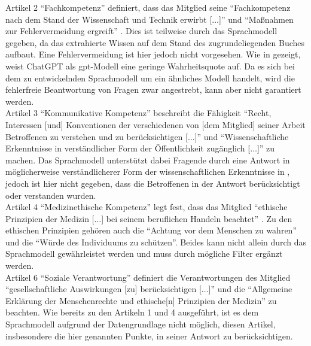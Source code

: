 Artikel 2 \enquote{Fachkompetenz} definiert, dass das Mitglied seine \enquote{Fachkompetenz nach dem Stand der Wissenschaft und Technik erwirbt [$\dots$]} und \enquote{Maßnahmen zur Fehlervermeidung ergreift} \citep{gmds_eth}.
Dies ist teilweise durch das Sprachmodell gegeben, da das extrahierte Wissen auf dem Stand des zugrundeliegenden Buches \citet{bb} aufbaut.
Eine Fehlervermeidung ist hier jedoch nicht vorgesehen.
Wie in \citet{chatgpt_qas} gezeigt, weist ChatGPT als \ac{gpt}-Modell eine geringe Wahrheitsquote auf.
Da es sich bei dem zu entwickelnden Sprachmodell um ein ähnliches Modell handelt, wird die fehlerfreie Beantwortung von Fragen zwar angestrebt, kann aber nicht garantiert werden.\\

Artikel 3 \enquote{Kommunikative Kompetenz} beschreibt die Fähigkeit
\enquote{Recht, Interessen [und] Konventionen der verschiedenen von [dem Mitglied] seiner Arbeit Betroffenen zu verstehen und zu berücksichtigen [$\dots$]} und
\enquote{Wissenschaftliche Erkenntnisse in verständlicher Form der Öffentlichkeit zugänglich [$\dots$]} \citep{gmds_eth} zu machen.
Das Sprachmodell unterstützt dabei Fragende durch eine Antwort in möglicherweise verständlicherer Form der wissenschaftlichen Erkenntnisse in \citet{bb},
jedoch ist hier nicht gegeben, dass die Betroffenen in der Antwort berücksichtigt oder verstanden wurden.\\

Artikel 4 \enquote{Medizinethische Kompetenz} legt fest, dass das Mitglied
\enquote{ethische Prinzipien der Medizin [$\dots$] bei seinem beruflichen Handeln beachtet} \citep{gmds_eth}.
Zu den ethischen Prinzipien \citep{gmds_eth} gehören auch die \enquote{Achtung vor dem Menschen zu wahren} und die \enquote{Würde des Individuums zu schützen}.
Beides kann nicht allein durch das Sprachmodell gewährleistet werden und muss durch mögliche Filter ergänzt werden.\\

Artikel 6 \enquote{Soziale Verantwortung} definiert die Verantwortungen des Mitglied
\enquote{gesellschaftliche Auswirkungen [zu] berücksichtigen [$\dots$]} und die
\enquote{Allgemeine Erklärung der Menschenrechte und ethische[n] Prinzipien der Medizin} \citep{gmds_eth} zu beachten.
Wie bereits zu den Artikeln 1 und 4 ausgeführt, ist es dem Sprachmodell aufgrund der Datengrundlage nicht möglich, diesen Artikel, insbesondere die hier genannten Punkte, in seiner Antwort zu berücksichtigen.\\

